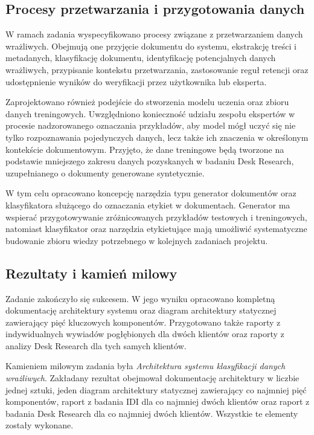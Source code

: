 \documentclass[12pt,a4paper]{report}
\begin{document}
\subsection{Procesy przetwarzania i przygotowania danych}
W ramach zadania wyspecyfikowano procesy związane z przetwarzaniem danych wrażliwych. Obejmują one przyjęcie dokumentu do systemu, ekstrakcję treści i metadanych, klasyfikację dokumentu, identyfikację potencjalnych danych wrażliwych, przypisanie kontekstu przetwarzania, zastosowanie reguł retencji oraz udostępnienie wyników do weryfikacji przez użytkownika lub eksperta.

Zaprojektowano również podejście do stworzenia modelu uczenia oraz zbioru danych treningowych. Uwzględniono konieczność udziału zespołu ekspertów w procesie nadzorowanego oznaczania przykładów, aby model mógł uczyć się nie tylko rozpoznawania pojedynczych danych, lecz także ich znaczenia w określonym kontekście dokumentowym. Przyjęto, że dane treningowe będą tworzone na podstawie mniejszego zakresu danych pozyskanych w badaniu Desk Research, uzupełnianego o dokumenty generowane syntetycznie.

W tym celu opracowano koncepcję narzędzia typu generator dokumentów oraz klasyfikatora służącego do oznaczania etykiet w dokumentach. Generator ma wspierać przygotowywanie zróżnicowanych przykładów testowych i treningowych, natomiast klasyfikator oraz narzędzia etykietujące mają umożliwić systematyczne budowanie zbioru wiedzy potrzebnego w kolejnych zadaniach projektu.

\subsection{Rezultaty i kamień milowy}
Zadanie zakończyło się sukcesem. W jego wyniku opracowano kompletną dokumentację architektury systemu oraz diagram architektury statycznej zawierający pięć kluczowych komponentów. Przygotowano także raporty z indywidualnych wywiadów pogłębionych dla dwóch klientów oraz raporty z analizy Desk Research dla tych samych klientów.

Kamieniem milowym zadania była \textit{Architektura systemu klasyfikacji danych wrażliwych}. Zakładany rezultat obejmował dokumentację architektury w liczbie jednej sztuki, jeden diagram architektury statycznej zawierający co najmniej pięć komponentów, raport z badania IDI dla co najmniej dwóch klientów oraz raport z badania Desk Research dla co najmniej dwóch klientów. Wszystkie te elementy zostały wykonane.
\end{document}
